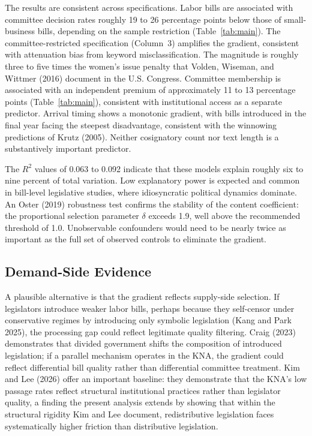 \documentclass[11pt]{article}
\begin{document}
The results are consistent across specifications. Labor bills are associated with committee decision rates roughly 19 to 26 percentage points below those of small-business bills, depending on the sample restriction (Table~\ref{tab:main}). The committee-restricted specification (Column~3) amplifies the gradient, consistent with attenuation bias from keyword misclassification. The magnitude is roughly three to five times the women's issue penalty that Volden, Wiseman, and Wittmer (2016) document in the U.S. Congress. Committee membership is associated with an independent premium of approximately 11 to 13 percentage points (Table~\ref{tab:main}), consistent with institutional access as a separate predictor. Arrival timing shows a monotonic gradient, with bills introduced in the final year facing the steepest disadvantage, consistent with the winnowing predictions of Krutz (2005). Neither cosignatory count nor text length is a substantively important predictor.

The $R^2$ values of 0.063 to 0.092 indicate that these models explain roughly six to nine percent of total variation. Low explanatory power is expected and common in bill-level legislative studies, where idiosyncratic political dynamics dominate. An Oster (2019) robustness test confirms the stability of the content coefficient: the proportional selection parameter $\delta$ exceeds 1.9, well above the recommended threshold of 1.0. Unobservable confounders would need to be nearly twice as important as the full set of observed controls to eliminate the gradient.

\subsection{Demand-Side Evidence}

A plausible alternative is that the gradient reflects supply-side selection. If legislators introduce weaker labor bills, perhaps because they self-censor under conservative regimes by introducing only symbolic legislation (Kang and Park 2025), the processing gap could reflect legitimate quality filtering. Craig (2023) demonstrates that divided government shifts the composition of introduced legislation; if a parallel mechanism operates in the KNA, the gradient could reflect differential bill quality rather than differential committee treatment. Kim and Lee (2026) offer an important baseline: they demonstrate that the KNA's low passage rates reflect structural institutional practices rather than legislator quality, a finding the present analysis extends by showing that within the structural rigidity Kim and Lee document, redistributive legislation faces systematically higher friction than distributive legislation.
\end{document}
